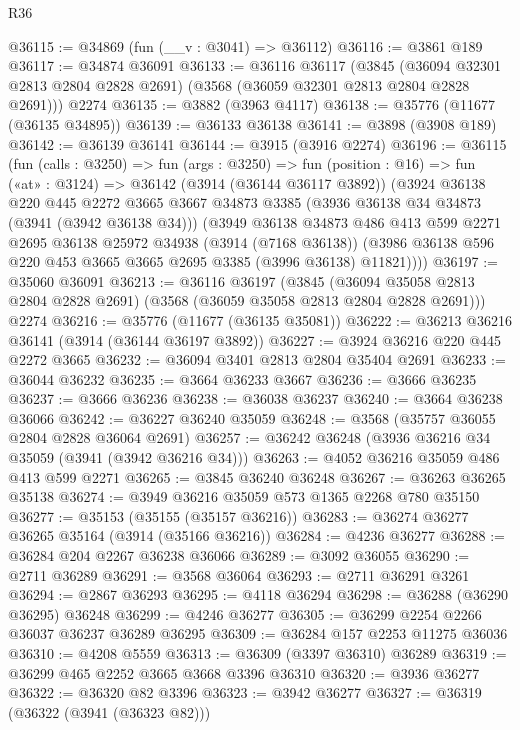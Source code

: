 \begin{lexlean}{R36}
\begin{coremodule}
@36115 := @34869 (fun (__v : @3041) => @36112)
@36116 := @3861 @189
@36117 := @34874 @36091
@36133 := @36116
    @36117
    (@3845 (@36094 @32301 @2813 @2804 @2828 @2691) (@3568 (@36059 @32301 @2813 @2804 @2828 @2691)))
    @2274
@36135 := @3882 (@3963 @4117)
@36138 := @35776 (@11677 (@36135 @34895))
@36139 := @36133 @36138
@36141 := @3898 (@3908 @189)
@36142 := @36139 @36141
@36144 := @3915 (@3916 @2274)
@36196 := @36115
    (fun (calls : @3250) =>
    fun (args : @3250) =>
    fun (position : @16) =>
    fun («at» : @3124) =>
    @36142
      (@3914 (@36144 @36117 @3892))
      (@3924
        @36138
        @220
        @445
        @2272
        @3665
        @3667
        @34873
        @3385
        (@3936 @36138 @34 @34873 (@3941 (@3942 @36138 @34)))
        (@3949
          @36138
          @34873
          @486
          @413
          @599
          @2271
          @2695
          @36138
          @25972
          @34938
          (@3914 (@7168 @36138))
          (@3986 @36138 @596 @220 @453 @3665 @3665 @2695 @3385 (@3996 @36138) @11821))))
@36197 := @35060 @36091
@36213 := @36116
    @36197
    (@3845 (@36094 @35058 @2813 @2804 @2828 @2691) (@3568 (@36059 @35058 @2813 @2804 @2828 @2691)))
    @2274
@36216 := @35776 (@11677 (@36135 @35081))
@36222 := @36213 @36216 @36141 (@3914 (@36144 @36197 @3892))
@36227 := @3924 @36216 @220 @445 @2272 @3665
@36232 := @36094 @3401 @2813 @2804 @35404 @2691
@36233 := @36044 @36232
@36235 := @3664 @36233 @3667
@36236 := @3666 @36235
@36237 := @3666 @36236
@36238 := @36038 @36237
@36240 := @3664 @36238 @36066
@36242 := @36227 @36240 @35059
@36248 := @3568 (@35757 @36055 @2804 @2828 @36064 @2691)
@36257 := @36242 @36248 (@3936 @36216 @34 @35059 (@3941 (@3942 @36216 @34)))
@36263 := @4052 @36216 @35059 @486 @413 @599 @2271
@36265 := @3845 @36240 @36248
@36267 := @36263 @36265 @35138
@36274 := @3949 @36216 @35059 @573 @1365 @2268 @780 @35150
@36277 := @35153 (@35155 (@35157 @36216))
@36283 := @36274 @36277 @36265 @35164 (@3914 (@35166 @36216))
@36284 := @4236 @36277
@36288 := @36284 @204 @2267 @36238 @36066
@36289 := @3092 @36055
@36290 := @2711 @36289
@36291 := @3568 @36064
@36293 := @2711 @36291 @3261
@36294 := @2867 @36293
@36295 := @4118 @36294
@36298 := @36288 (@36290 @36295) @36248
@36299 := @4246 @36277
@36305 := @36299 @2254 @2266 @36037 @36237 @36289 @36295
@36309 := @36284 @157 @2253 @11275 @36036
@36310 := @4208 @5559
@36313 := @36309 (@3397 @36310) @36289
@36319 := @36299 @465 @2252 @3665 @3668 @3396 @36310
@36320 := @3936 @36277
@36322 := @36320 @82 @3396
@36323 := @3942 @36277
@36327 := @36319 (@36322 (@3941 (@36323 @82)))

\end{coremodule}
\end{lexlean}

